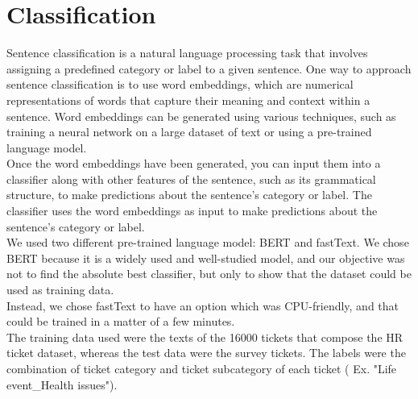 \section{Classification}
Sentence classification is a natural language processing task that involves assigning a predefined category or label to a given sentence. One way to approach sentence classification is to use word embeddings, which are numerical representations of words that capture their meaning and context within a sentence. Word embeddings can be generated using various techniques, such as training a neural network on a large dataset of text or using a pre-trained language model. \\
Once the word embeddings have been generated, you can input them into a classifier along with other features of the sentence, such as its grammatical structure, to make predictions about the sentence's category or label. The classifier uses the word embeddings as input to make predictions about the sentence's category or label. \\
We used two different pre-trained language model: BERT and fastText. We chose BERT because it is a widely used and well-studied model, and our objective was not to find the absolute best classifier, but only to show that the dataset could be used as training data. \\
Instead, we chose fastText to have an option which was CPU-friendly, and that could be trained in a matter of a few minutes. \\
The training data used were the texts of the 16000 tickets that compose the HR ticket dataset, whereas the test data were the survey tickets. The labels were the combination of ticket category and ticket subcategory of each ticket ( Ex. "Life event\_Health issues").


